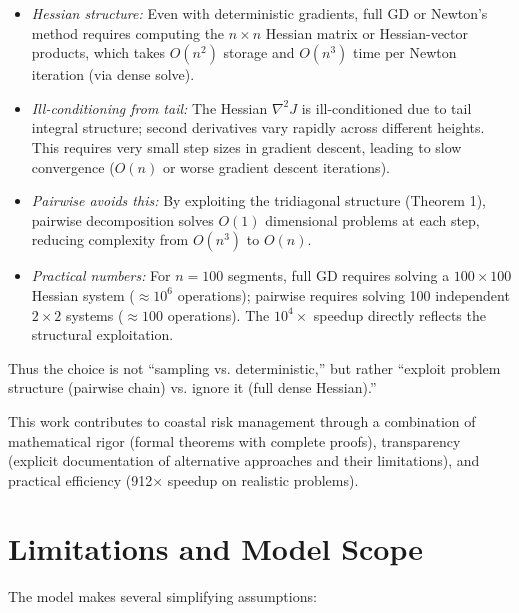 \documentclass[12pt]{article}
\theoremstyle{definition}
\begin{document}
\begin{itemize}
    \item \emph{Hessian structure:} Even with deterministic gradients, full GD or Newton's method requires computing the $n \times n$ Hessian matrix or Hessian-vector products, which takes $O(n^2)$ storage and $O(n^3)$ time per Newton iteration (via dense solve).

    \item \emph{Ill-conditioning from tail:} The Hessian $\nabla^2 J$ is ill-conditioned due to tail integral structure; second derivatives vary rapidly across different heights. This requires very small step sizes in gradient descent, leading to slow convergence ($O(n)$ or worse gradient descent iterations).

    \item \emph{Pairwise avoids this:} By exploiting the tridiagonal structure (Theorem 1), pairwise decomposition solves $O(1)$ dimensional problems at each step, reducing complexity from $O(n^3)$ to $O(n)$.

    \item \emph{Practical numbers:} For $n=100$ segments, full GD requires solving a $100 \times 100$ Hessian system ($\approx 10^6$ operations); pairwise requires solving 100 independent $2 \times 2$ systems ($\approx 100$ operations). The $10^4 \times$ speedup directly reflects the structural exploitation.
\end{itemize}

Thus the choice is not ``sampling vs. deterministic,'' but rather ``exploit problem structure (pairwise chain) vs. ignore it (full dense Hessian).''

This work contributes to coastal risk management through a combination of mathematical rigor (formal theorems with complete proofs), transparency (explicit documentation of alternative approaches and their limitations), and practical efficiency (912× speedup on realistic problems).

\section*{Limitations and Model Scope}

The model makes several simplifying assumptions:
\end{document}
